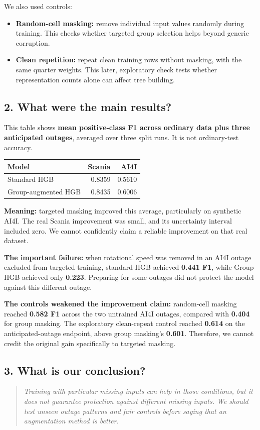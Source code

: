 \documentclass[11pt,a4paper]{article}
\begin{document}
We also used controls:
\begin{itemize}
\item \textbf{Random-cell masking:} remove individual input values randomly during training. This checks whether targeted group selection helps beyond generic corruption.
\item \textbf{Clean repetition:} repeat clean training rows without masking, with the same quarter weights. This later, exploratory check tests whether representation counts alone can affect tree building.
\end{itemize}

\subsection*{2. What were the main results?}
This table shows \textbf{mean positive-class F1 across ordinary data plus three anticipated outages}, averaged over three split runs. It is not ordinary-test accuracy.
\begin{center}
\begin{tabular}{lrr}\toprule
Model & Scania & AI4I\\\midrule
Standard HGB & 0.8359 & 0.5610\\
Group-augmented HGB & 0.8435 & 0.6006\\\bottomrule
\end{tabular}
\end{center}
\textbf{Meaning:} targeted masking improved this average, particularly on synthetic AI4I. The real Scania improvement was small, and its uncertainty interval included zero. We cannot confidently claim a reliable improvement on that real dataset.

\textbf{The important failure:} when rotational speed was removed in an AI4I outage excluded from targeted training, standard HGB achieved \textbf{0.441 F1}, while Group-HGB achieved only \textbf{0.223}. Preparing for some outages did not protect the model against this different outage.

\textbf{The controls weakened the improvement claim:} random-cell masking reached \textbf{0.582 F1} across the two untrained AI4I outages, compared with \textbf{0.404} for group masking. The exploratory clean-repeat control reached \textbf{0.614} on the anticipated-outage endpoint, above group masking's \textbf{0.601}. Therefore, we cannot credit the original gain specifically to targeted masking.

\subsection*{3. What is our conclusion?}
\begin{quote}\itshape
Training with particular missing inputs can help in those conditions, but it does not guarantee protection against different missing inputs. We should test unseen outage patterns and fair controls before saying that an augmentation method is better.
\end{quote}
\end{document}
